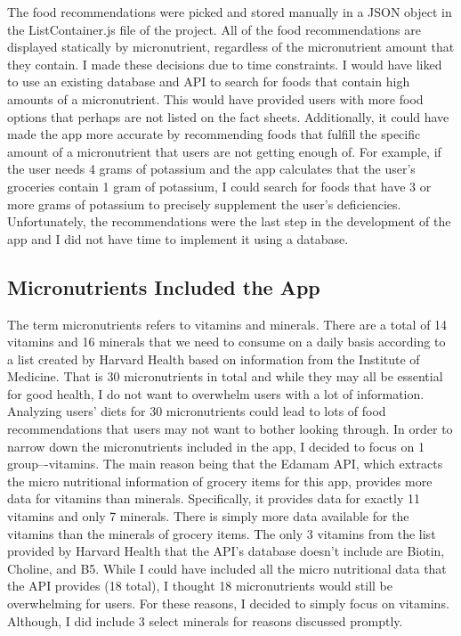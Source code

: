 \documentclass[10pt,twocolumn]{article}
\begin{document}
The food recommendations were picked and stored manually in a JSON object in the ListContainer.js file of the project. All of the food recommendations are displayed statically by micronutrient, regardless of the micronutrient amount that they contain. I made these decisions due to time constraints. I would have liked to use an existing database and API to search for foods that contain high amounts of a micronutrient. This would have provided users with more food options that perhaps are not listed on the fact sheets. Additionally, it could have made the app more accurate by recommending foods that fulfill the specific amount of a micronutrient that users are not getting enough of. For example, if the user needs 4 grams of potassium and the app calculates that the user’s groceries contain 1 gram of potassium, I could search for foods that have 3 or more grams of potassium to precisely supplement the user’s deficiencies. Unfortunately, the recommendations were the last step in the development of the app and I did not have time to implement it using a database. 

\subsection{Micronutrients Included the App}
The term micronutrients refers to vitamins and minerals. There are a total of 14 vitamins and 16 minerals that we need to consume on a daily basis according to a list created by Harvard Health based on information from the Institute of Medicine.\cite{harvard_health_2020} That is 30 micronutrients in total and while they may all be essential for good health, I do not want to overwhelm users with a lot of information. Analyzing users' diets for 30 micronutrients could lead to lots of food recommendations that users may not want to bother looking through. In order to narrow down the micronutrients included in the app, I decided to focus on 1 group–-vitamins. The main reason being that the Edamam API, which extracts the micro nutritional information of grocery items for this app, provides more data for vitamins than minerals. Specifically, it provides data for exactly 11 vitamins and only 7 minerals.\cite{edamam_doc} There is simply more data available for the vitamins than the minerals of grocery items. The only 3 vitamins from the list provided by Harvard Health that the API’s database doesn’t include are Biotin, Choline, and B5. While I could have included all the micro nutritional data that the API provides (18 total), I thought 18 micronutrients would still be overwhelming for users. For these reasons, I decided to simply focus on vitamins. Although, I did include 3 select minerals for reasons discussed promptly. 
\end{document}
